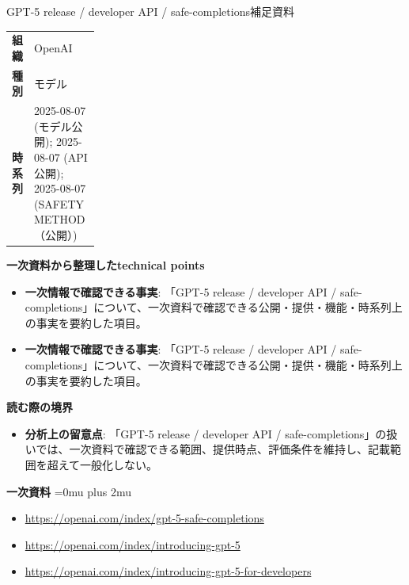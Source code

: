 \begin{technicalnote}{GPT-5 release / developer API / safe-completions}{補足資料}
\begingroup
\begin{tabularx}{\linewidth}{@{}>{\bfseries}p{0.22\linewidth}X@{}}
組織 & OpenAI \\
種別 & モデル \\
時系列 & 2025-08-07 (モデル公開); 2025-08-07 (API公開); 2025-08-07 (SAFETY METHOD（公開）) \\
\end{tabularx}
\smallskip
{\bfseries 一次資料から整理したtechnical points}
\begin{itemize}[leftmargin=1.5em,itemsep=0.35em]
\item \textbf{一次情報で確認できる事実}: 「GPT-5 release / developer API / safe-completions」について、一次資料で確認できる公開・提供・機能・時系列上の事実を要約した項目。
\item \textbf{一次情報で確認できる事実}: 「GPT-5 release / developer API / safe-completions」について、一次資料で確認できる公開・提供・機能・時系列上の事実を要約した項目。
\end{itemize}
\begin{minipage}{\linewidth}
{\bfseries 読む際の境界}
\begin{itemize}[leftmargin=1.5em,itemsep=0.35em]
\item \textbf{分析上の留意点}: 「GPT-5 release / developer API / safe-completions」の扱いでは、一次資料で確認できる範囲、提供時点、評価条件を維持し、記載範囲を超えて一般化しない。
\end{itemize}
\begin{samepage}
{\bfseries 一次資料}
\begingroup\sloppy
\Urlmuskip=0mu plus 2mu\relax
\begin{itemize}[leftmargin=1.5em,itemsep=0.25em]
\item {\scriptsize\url{https://openai.com/index/gpt-5-safe-completions}}
\item {\scriptsize\url{https://openai.com/index/introducing-gpt-5}}
\item {\scriptsize\url{https://openai.com/index/introducing-gpt-5-for-developers}}
\end{itemize}
\endgroup
\end{samepage}
\end{minipage}
\endgroup
\end{technicalnote}
\medskip

